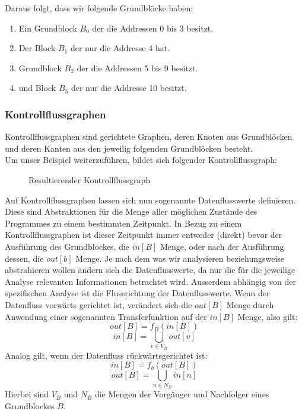 Daraus folgt, dass wir folgende Grundblöcke haben:
\begin{enumerate}
  \item Ein Grundblock $B_0$ der die Addressen 0 bis 3 besitzt.
  \item Der Block $B_1$ der nur die Addresse 4 hat.
  \item Grundblock $B_2$ der die Addressen 5 bis 9 besitzt.
  \item und Block $B_3$ der nur die Addresse 10 besitzt.
\end{enumerate}




\newpage
\subsubsection{Kontrollflussgraphen}
Kontrollflussgraphen sind gerichtete Graphen, deren Knoten aus Grundblöcken und 
deren Kanten aus den jeweilig folgenden Grundblöcken besteht.\\

Um unser Beispiel weiterzuführen, bildet sich folgender Kontrollflussgraph:
\begin{figure}[h]
  \centering
  \caption{Resultierender Kontrollflussgraph}
  \label{fig:fib-cfg}
\end{figure}

Auf Kontrollflussgraphen lassen sich nun sogenannte Datenflusswerte definieren.
Diese sind Abstraktionen für die Menge aller möglichen Zustände des Programmes
zu einem bestimmten Zeitpunkt. In Bezug zu einem Kontrollflussgraphen ist dieser
Zeitpunkt immer entweder (direkt) bevor der Ausführung des Grundblockes, die $in[B]$ Menge,
oder nach der Ausführung dessen, die $out[b]$ Menge.
Je nach dem was wir analysieren beziehungsweise abstrahieren wollen ändern sich
die Datenflusswerte, da nur die für die jeweilige Analyse relevanten Informationen
betrachtet wird. Ausserdem abhängig von der spezifischen Analyse ist die
Flussrichtung der Datenflusswerte. Wenn der Datenfluss vorwärts gerichtet ist,
verändert sich die $out[B]$ Menge durch Anwendung einer sogenannten Transferfunktion
auf der $in[B]$ Menge, also gilt:
\[out[B]=f_B(in[B])\] 
\[in[B]=\bigcup_{v\in V_B}out[v]\]
Analog gilt, wenn der Datenfluss
rückwärtsgerichtet ist: 
\[in[B]=f_b(out[B])\]
\[out[B]=\bigcup_{n\in N_B}in[n]\]
Hierbei sind $V_B$ und $N_B$ die Mengen der Vorgänger und Nachfolger
eines Grundblockes $B$.\cite[S.732-734]{D}



